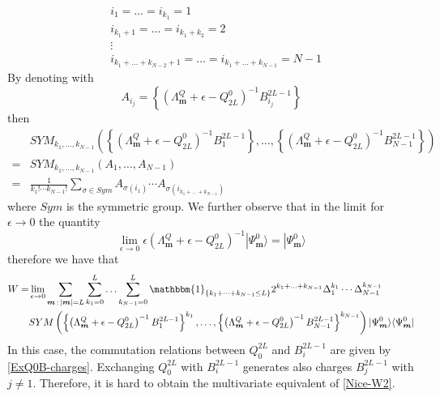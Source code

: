 \documentclass[10pt]{article}
\numberwithin{equation}{section}
\numberwithin{equation}{subsection}
\begin{document}
\begin{equation}
	\begin{split}
		&i_{1}=\ldots=i_{k_{1}}=1\\
	&	i_{k_{1}+1}=\ldots=i_{k_{1}+k_{2}}=2\\
		&\vdots\\
		&i_{k_{1}+\ldots+k_{N-2}+1}=\ldots=i_{k_{1}+\ldots+k_{N-1}}=N-1
	\end{split}
\end{equation}
By denoting with 
\begin{equation}\label{definitionA}
	A_{i_{j}}=\left\{\left(\Lambda_{\bm{m}}^{Q}+\epsilon-Q_{2L}^{0}\right)^{-1}B_{i_{j}}^{2L-1}\right\}
\end{equation}
then 
\begin{equation}
	\begin{split}
&SYM_{k_{1},\ldots,k_{N-1}}\left(\left\{\left(\Lambda_{\bm{m}}^{Q}+\epsilon-Q_{2L}^{0}\right)^{-1}B_{1}^{2L-1}\right\},\ldots,\left\{\left(\Lambda_{\bm{m}}^{Q}+\epsilon-Q_{2L}^{0}\right)^{-1}B_{N-1}^{2L-1}\right\}\right)\\=&
SYM_{k_{1},\ldots,k_{N-1}}\left(A_{1},\ldots,A_{N-1}\right)\\
=&\frac{1}{k_{1}!\cdots k_{N-1}!}\sum_{\sigma\in Sym}A_{\sigma(i_{1})}\cdots A_{\sigma(i_{k_{1}+\ldots+k_{N-1}})}
	\end{split}
\end{equation}
where $Sym$ is the symmetric group. 
We further observe that in the limit for $\epsilon\to 0$ the quantity 
\begin{equation}
	\lim_{\epsilon\to 0}	\epsilon\left(\Lambda_{\bm{m}}^{Q}+\epsilon-Q_{2L}^{0}\right)^{-1}|\Psi_{\bm{m}}^{0}\rangle=|\Psi_{\bm{m}}^{0}\rangle
\end{equation}
therefore we have that 
\begin{equation}
	\begin{split}
		W=&\lim_{\epsilon\to 0}\sum_{\bm{m}\,:\,|\bm{m}|=L}\sum_{k_{1}=0}^{L}\ldots\sum_{k_{N-1}=0}^{L}\mathbbm{1}_{\{k_{1}+\cdots+k_{N-1}\leq L\}}2^{k_{1}+\ldots+k_{N-1}}\Delta_{1}^{k_{1}}\cdots\Delta_{N-1}^{k_{N-1}}\\&SYM\left(\left\{\left(\Lambda_{\bm{m}}^{Q}+\epsilon-Q_{2L}^{0}\right)^{-1}B_{1}^{2L-1}\right\}^{k_{1}},\ldots,\left\{\left(\Lambda_{\bm{m}}^{Q}+\epsilon-Q_{2L}^{0}\right)^{-1}B_{N-1}^{2L-1}\right\}^{k_{N-1}}\right)
		|\Psi_{\bm{m}}^{0}\rangle \langle \Psi_{\bm{m}}^{0}|
	\end{split}
\end{equation}
In this case, the commutation relations between $Q_{0}^{2L}$ and $B_{i}^{2L-1}$ are given by \eqref{ExQ0B-charges}. Exchanging $Q_{0}^{2L}$ with $B_{i}^{2L-1}$ generates also charges $B_{j}^{2L-1}$ with $j\neq 1$. Therefore, it is hard to obtain the multivariate equivalent of \eqref{Nice-W2}. 
\end{document}

